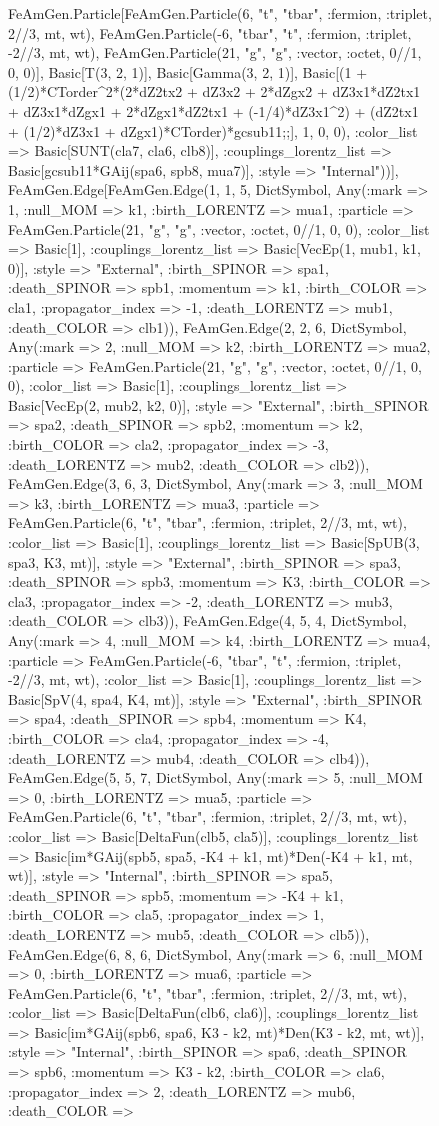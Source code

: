 \documentclass{revtex4}
\begin{document}
\begin{figure}[!htb]
\begin{center}
{FeAmGen.Particle[FeAmGen.Particle(6, "t", "tbar", :fermion, :triplet, 2//3, mt, wt), FeAmGen.Particle(-6, "tbar", "t", :fermion, :triplet, -2//3, mt, wt), FeAmGen.Particle(21, "g", "g", :vector, :octet, 0//1, 0, 0)], Basic[T(3, 2, 1)], Basic[Gamma(3, 2, 1)], Basic[(1 + (1/2)*CTorder^2*(2*dZ2tx2 + dZ3x2 + 2*dZgx2 + dZ3x1*dZ2tx1 + dZ3x1*dZgx1 + 2*dZgx1*dZ2tx1 + (-1/4)*dZ3x1^2) + (dZ2tx1 + (1/2)*dZ3x1 + dZgx1)*CTorder)*gcsub11;;], 1, 0, 0), :color_list => Basic[SUNT(cla7, cla6, clb8)], :couplings_lorentz_list => Basic[gcsub11*GAij(spa6, spb8, mua7)], :style => "Internal"))], FeAmGen.Edge[FeAmGen.Edge(1, 1, 5, Dict{Symbol, Any}(:mark => 1, :null_MOM => k1, :birth_LORENTZ => mua1, :particle => FeAmGen.Particle(21, "g", "g", :vector, :octet, 0//1, 0, 0), :color_list => Basic[1], :couplings_lorentz_list => Basic[VecEp(1, mub1, k1, 0)], :style => "External", :birth_SPINOR => spa1, :death_SPINOR => spb1, :momentum => k1, :birth_COLOR => cla1, :propagator_index => -1, :death_LORENTZ => mub1, :death_COLOR => clb1)), FeAmGen.Edge(2, 2, 6, Dict{Symbol, Any}(:mark => 2, :null_MOM => k2, :birth_LORENTZ => mua2, :particle => FeAmGen.Particle(21, "g", "g", :vector, :octet, 0//1, 0, 0), :color_list => Basic[1], :couplings_lorentz_list => Basic[VecEp(2, mub2, k2, 0)], :style => "External", :birth_SPINOR => spa2, :death_SPINOR => spb2, :momentum => k2, :birth_COLOR => cla2, :propagator_index => -3, :death_LORENTZ => mub2, :death_COLOR => clb2)), FeAmGen.Edge(3, 6, 3, Dict{Symbol, Any}(:mark => 3, :null_MOM => k3, :birth_LORENTZ => mua3, :particle => FeAmGen.Particle(6, "t", "tbar", :fermion, :triplet, 2//3, mt, wt), :color_list => Basic[1], :couplings_lorentz_list => Basic[SpUB(3, spa3, K3, mt)], :style => "External", :birth_SPINOR => spa3, :death_SPINOR => spb3, :momentum => K3, :birth_COLOR => cla3, :propagator_index => -2, :death_LORENTZ => mub3, :death_COLOR => clb3)), FeAmGen.Edge(4, 5, 4, Dict{Symbol, Any}(:mark => 4, :null_MOM => k4, :birth_LORENTZ => mua4, :particle => FeAmGen.Particle(-6, "tbar", "t", :fermion, :triplet, -2//3, mt, wt), :color_list => Basic[1], :couplings_lorentz_list => Basic[SpV(4, spa4, K4, mt)], :style => "External", :birth_SPINOR => spa4, :death_SPINOR => spb4, :momentum => K4, :birth_COLOR => cla4, :propagator_index => -4, :death_LORENTZ => mub4, :death_COLOR => clb4)), FeAmGen.Edge(5, 5, 7, Dict{Symbol, Any}(:mark => 5, :null_MOM => 0, :birth_LORENTZ => mua5, :particle => FeAmGen.Particle(6, "t", "tbar", :fermion, :triplet, 2//3, mt, wt), :color_list => Basic[DeltaFun(clb5, cla5)], :couplings_lorentz_list => Basic[im*GAij(spb5, spa5, -K4 + k1, mt)*Den(-K4 + k1, mt, wt)], :style => "Internal", :birth_SPINOR => spa5, :death_SPINOR => spb5, :momentum => -K4 + k1, :birth_COLOR => cla5, :propagator_index => 1, :death_LORENTZ => mub5, :death_COLOR => clb5)), FeAmGen.Edge(6, 8, 6, Dict{Symbol, Any}(:mark => 6, :null_MOM => 0, :birth_LORENTZ => mua6, :particle => FeAmGen.Particle(6, "t", "tbar", :fermion, :triplet, 2//3, mt, wt), :color_list => Basic[DeltaFun(clb6, cla6)], :couplings_lorentz_list => Basic[im*GAij(spb6, spa6, K3 - k2, mt)*Den(K3 - k2, mt, wt)], :style => "Internal", :birth_SPINOR => spa6, :death_SPINOR => spb6, :momentum => K3 - k2, :birth_COLOR => cla6, :propagator_index => 2, :death_LORENTZ => mub6, :death_COLOR => }
\end{center}
\end{figure}
\end{document}
